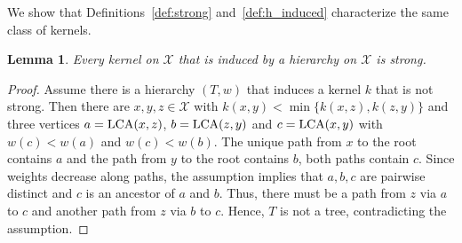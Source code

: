\documentclass{article}
\newtheorem{lemma}{Lemma}
\newcommand{\X}{\ensuremath{\mathcal{X}}\xspace}
\begin{document}
We show that Definitions~\ref{def:strong} and~\ref{def:h_induced} characterize 
the same class of kernels.

\begin{lemma}\label{prop:strong_hierarchy:left}
 Every kernel on \X that is induced by a hierarchy on \X is strong.
\end{lemma}
\begin{proof}
Assume there is a hierarchy $(T,w)$ that induces a kernel $k$ that is not strong.
Then there are $x,y,z \in \X$ with $k(x,y) < \min\{k(x,z), k(z,y)\}$ and three 
vertices $a={\rm LCA}(x,z)$, $b={\rm LCA}(z,y)$ and $c={\rm LCA}(x,y)$ with 
$w(c) < w(a)$ and $w(c) < w(b)$. 
The unique path from $x$ to the root contains $a$ and the path from $y$ to the 
root contains $b$, both paths contain $c$.
Since weights decrease along paths, the assumption implies that $a,b,c$ are 
pairwise distinct and $c$ is an ancestor of $a$ and $b$. 
Thus, there must be a path from $z$ via $a$ to $c$ and another path from $z$ 
via $b$ to $c$.
Hence, $T$ is not a tree, contradicting the assumption.
\end{proof}
\end{document}
